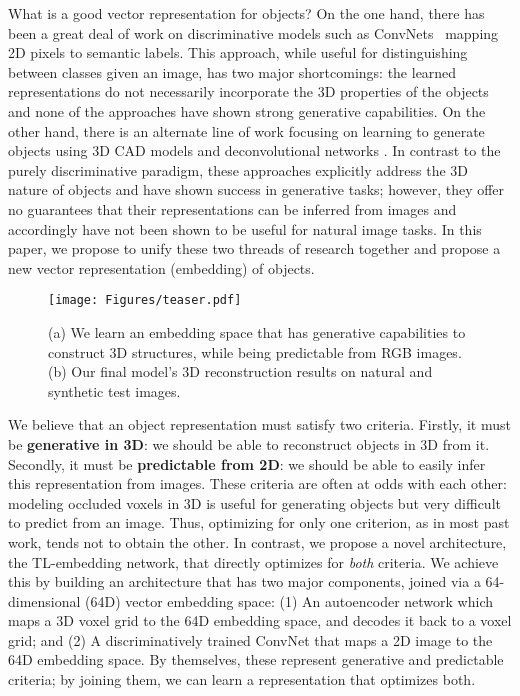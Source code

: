 \documentclass[runningheads]{llncs}
\begin{document}
What is a good vector representation for objects? On the one hand, there has
been a great deal of work on discriminative models such as
ConvNets~\cite{AlexNet,Simonyan14c} mapping 2D pixels to semantic labels.
This approach, while useful for 
distinguishing between classes given an image, has
two major shortcomings: the learned representations do not necessarily incorporate 
the 3D properties of the objects and none of the approaches have shown strong 
generative capabilities. On the other hand, there is an alternate line of work focusing on 
learning to generate objects using 3D CAD models and deconvolutional networks \cite{chair-brox,dcign}.
In contrast to the purely discriminative paradigm, these approaches explicitly
address the 3D nature of objects and have shown success in generative tasks;
however, they offer no guarantees that their representations can be inferred
from images and accordingly have not been shown to be useful for natural image tasks.
In this paper, we propose to unify these two threads of research together and propose a new vector
representation (embedding) of objects.

\begin{figure}
\texttt{[image: Figures/teaser.pdf]}
\caption{(a) We learn an embedding space that has generative capabilities to construct 3D structures,
while being predictable from RGB images. (b) Our final model's 3D reconstruction results on natural and synthetic
test images.}
\end{figure}

We believe that an object representation must satisfy two criteria. 
Firstly, it must be {\bf generative in 3D}:
we should be
able to reconstruct 
objects in 3D from it. Secondly, 
it must be
{\bf predictable from 2D}:
we should be able to
easily infer this representation
from images. These criteria are often at odds with each other: modeling occluded voxels
in 3D is useful for generating objects but 
very difficult to predict from an image. Thus,
optimizing for only one criterion, as in most past work, tends not to obtain the other. In
contrast, we propose a novel architecture, the TL-embedding network, that
directly optimizes for {\it both} criteria. We achieve this by building an architecture
that has two major components, joined via a 64-dimensional (64D) vector embedding space:
(1) An autoencoder network which maps a 3D voxel grid to 
the 64D embedding space, and decodes it back to a voxel grid; and
(2) A discriminatively trained ConvNet 
that maps a 2D image to the 64D embedding space.
By themselves, these represent generative and predictable criteria; by joining them,
we can learn a representation that optimizes both.
\end{document}
